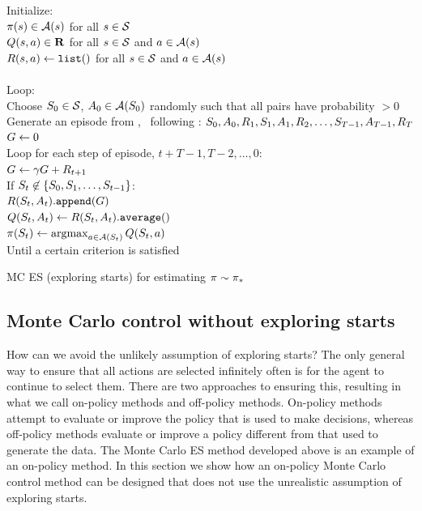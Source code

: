 \begin{table}
\beginalg
Initialize:\\
\> $\pi(s) \in \mathcal{A}(s)$ for all $s\in\mathcal{S}$\\
\> $Q(s,a) \in \mathbf{R}$ for all $s\in\mathcal{S}$ and $a\in\mathcal{A}(s)$\\
\> $R(s, a) \leftarrow {\tt list()}$ for all $s\in\mathcal{S}$ and $a\in\mathcal{A}(s)$\\
\\
Loop: \\
\> Choose $S_{0} \in \mathcal{S}$, $A_{0} \in \mathcal{A}(S_{0})$ randomly such that all pairs have probability $> 0$\\
\> Generate an episode from , \ following \pol: $S_{0}, A_{0}, R_{1}, S_{1}, A_{1}, R_{2}, \ldots, S_{T-1}, A_{T-1}, R_{T}$\\
\> $G \leftarrow 0$\\
\> Loop for each step of episode, $t+T-1, T-2, \ldots, 0$:\\
\> \> $G \leftarrow \gamma G + R_{t+1}$\\
\> \> If $S_{t} \not\in \{S_{0}, S_{1}, \ldots, S_{t-1}\}$:\\
\> \> \> $R(S_{t}, A_t){\tt.append}(G)$\\
\> \> \> $Q(S_{t}, A_t) \leftarrow R(S_{t}, A_t){\tt .average()}$\\
\> \> \> $\pi(S_{t}) \leftarrow \mathop{\mathrm {argmax}}_{a\in\mathcal{A}(S_{t})} Q(S_{t}, a)$\\
Until a certain criterion is satisfied
\endalg
\caption{MC ES (exploring starts) for estimating $\pi \sim {\ensuremath{\pi}}_\ast$}
\label{tab:alg:mc-es-control}
\end{table}



\subsection{Monte Carlo control without exploring starts}


How can we avoid the unlikely assumption of exploring starts?
The only general way to ensure that all actions are selected infinitely often
is for the agent to continue to select them.
There are two approaches to ensuring this,
resulting in what we call on-policy methods and off-policy methods.
On-policy methods attempt to evaluate or improve the policy
that is used to make decisions,
whereas off-policy methods evaluate or improve a policy different from
that used to generate the data.
The Monte Carlo ES method developed above is
an example of an on-policy method.
In this section we show how an on-policy Monte Carlo control method
can be designed that does not use the unrealistic assumption of exploring starts.

